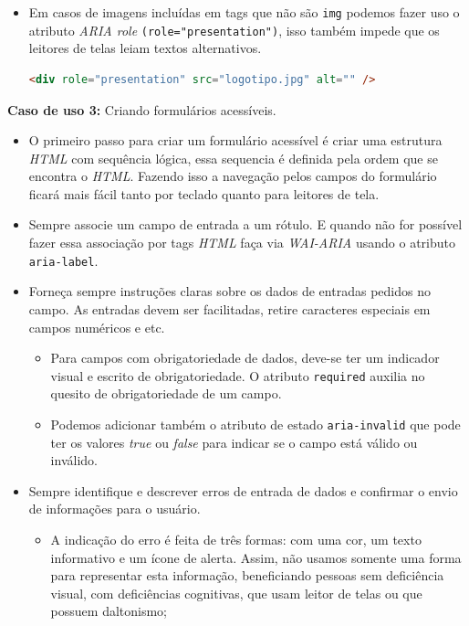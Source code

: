 {\begin{itemize}
\begin{itemize}
\item Em casos de imagens incluídas em tags que não são \lstinline{img} podemos fazer uso o atributo \textit{ARIA role} \lstinline{(role="presentation")}, isso também impede que os leitores de telas leiam textos alternativos.
{\begin{lstlisting}[language=html,caption=usando atributo rele="presentation"]
<div role="presentation" src="logotipo.jpg" alt="" />
\end{lstlisting}}
\end{itemize}


 
\end{itemize}}

{
\textbf{Caso de uso 3:} Criando formulários acessíveis.

\begin{itemize}
    \item O primeiro passo para criar um formulário acessível é criar uma estrutura \textit{HTML} com sequência lógica, essa sequencia é definida pela ordem que se encontra o \textit{HTML}. Fazendo isso a navegação pelos campos do formulário ficará mais fácil tanto por teclado quanto para leitores de tela. 
    \item Sempre associe um campo de entrada a um rótulo. E quando não for possível fazer essa associação por tags \textit{HTML} faça via \textit{WAI-ARIA} usando o atributo \lstinline{aria-label}.
    \item Forneça sempre instruções claras sobre os dados de entradas pedidos no campo. As entradas devem ser facilitadas, retire caracteres especiais em campos numéricos e etc. 
    \begin{itemize}
        \item Para campos com obrigatoriedade de dados, deve-se ter um indicador visual e escrito de obrigatoriedade. O atributo \lstinline{required} auxilia no quesito de obrigatoriedade de um campo.
        \item Podemos adicionar também o atributo de estado \lstinline{aria-invalid} que pode ter os valores \textit{true} ou \textit{false} para indicar se o campo está válido ou inválido.
    \end{itemize}
    \item Sempre identifique e descrever erros de entrada de dados e confirmar o envio de informações para o usuário. 
    \begin{itemize}
        \item A indicação do erro é feita de três formas: com uma cor, um texto informativo e um ícone de alerta. Assim, não usamos somente uma forma para representar esta informação, beneficiando pessoas sem deficiência visual, com deficiências cognitivas, que usam leitor de telas ou que possuem daltonismo;

\end{itemize}
\end{itemize}}
